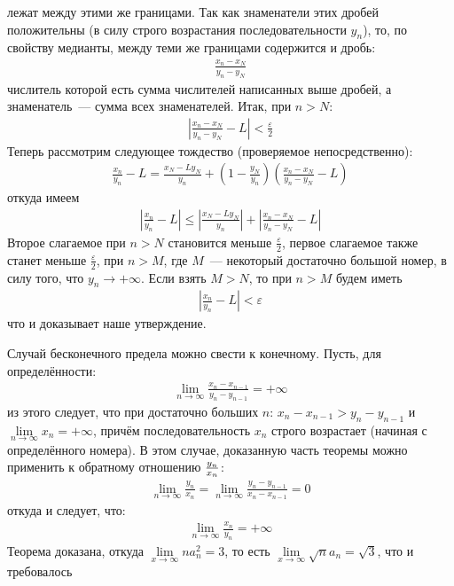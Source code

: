 		лежат между этими же границами. Так как знаменатели этих дробей положительны (в силу строго возрастания последовательности $y_n$), то, по свойству медианты, между теми же границами содержится и дробь:
		\begin{gather*}
			\frac{x_n - x_N}{y_n - y_N}
		\end{gather*}
		числитель которой есть сумма числителей написанных выше дробей, а знаменатель — сумма всех знаменателей. Итак, при $n > N$:
		\begin{gather*}
			\left| \frac{x_n - x_N}{y_n - y_N} - L \right| < \frac{\varepsilon}{2}
		\end{gather*}
		Теперь рассмотрим следующее тождество (проверяемое непосредственно):
		\begin{gather*}
			\frac{x_n}{y_n} - L = \frac{x_N - L y_N}{y_n} + \left( 1 - \frac{y_N}{y_n} \right) \left( \frac{x_n - x_N}{y_n - y_N} - L \right)
		\end{gather*}
		откуда имеем
		\begin{gather*}
			\left| \frac{x_n}{y_n} - L \right| \le \left| \frac{x_N - L y_N}{y_n} \right| + \left| \frac{x_n - x_N}{y_n - y_N} - L \right| 
		\end{gather*}
		Второе слагаемое при $n > N$ становится меньше $\frac{\varepsilon}{2}$, первое слагаемое также станет меньше $\frac{\varepsilon}{2}$, при $n > M$, где $M$ — некоторый достаточно большой номер, в силу того, что $y_n \to +\infty$. Если взять $M > N$, то при $n > M$ будем иметь
		\begin{gather*}
			\left | \frac{x_n}{y_n} - L \right | < \varepsilon
		\end{gather*}
		что и доказывает наше утверждение.
		
		Случай бесконечного предела можно свести к конечному. Пусть, для определённости:
		\begin{gather*}
			\lim\limits_{n \to \infty} \frac{x_n - x_{n-1}}{y_n - y_{n-1}} = +\infty
		\end{gather*}
		из этого следует, что при достаточно больших $n$:
		$x_n - x_{n-1} > y_n - y_{n-1}$ и
		$\lim\limits_{n \to \infty} x_n = +\infty$,
		причём последовательность $x_n$ строго возрастает (начиная с определённого номера). В этом случае, доказанную часть теоремы можно применить к обратному отношению $y_n \over x_n$:
		\begin{gather*}
			\lim\limits_{n \to \infty} \frac{y_n}{x_n} = \lim\limits_{n \to \infty} \frac{y_n - y_{n-1}}{x_n - x_{n-1}} = 0
		\end{gather*}
		откуда и следует, что:
		\begin{gather*}
			\lim\limits_{n \to \infty} \frac{x_n}{y_n} = + \infty
		\end{gather*}
		Теорема доказана, откуда $\lim\limits_{x \to \infty} na^2_n = 3$, то есть $\lim\limits_{x \to \infty} \sqrt{n}a_n = \sqrt{3}$, что и требовалось
		
